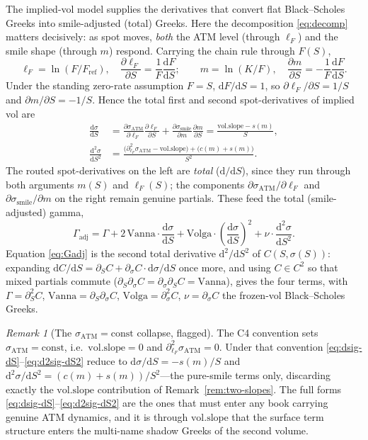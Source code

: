 \documentclass[11pt]{book}
\theoremstyle{plain}
\theoremstyle{definition}
\theoremstyle{remark}
\newtheorem{remark}[theorem]{Remark}
\newcommand{\mln}{m}                             %
\newcommand{\lF}{\ell_F}                         %
\newcommand{\Fref}{F_{\mathrm{ref}}}             %
\newcommand{\ssm}{\sigma_{\mathrm{smile}}}       %
\newcommand{\satm}{\sigma_{\mathrm{ATM}}}        %
\newcommand{\volslope}{\mathrm{vol.slope}}       %
\newcommand{\vega}{\nu}                          %
\newcommand{\Vanna}{\mathrm{Vanna}}
\newcommand{\Volga}{\mathrm{Volga}}
\newcommand{\Gadj}{\Gamma_{\mathrm{adj}}}        %
\newcommand{\dd}{\mathrm{d}}                                  %
\newcommand{\pd}[2]{\frac{\partial #1}{\partial #2}}          %
\newcommand{\td}[2]{\frac{\dd #1}{\dd #2}}                    %
\begin{document}
The implied-vol model supplies the derivatives that convert flat Black--Scholes
Greeks into smile-adjusted (total) Greeks. Here the decomposition
\eqref{eq:decomp} matters decisively: as spot moves, \emph{both} the ATM level
(through $\lF$) and the smile shape (through $\mln$) respond. Carrying the chain
rule through $F(S)$,
\[
\lF = \ln(F/\Fref), \quad \pd{\lF}{S} = \frac{1}{F}\td{F}{S};
\qquad
\mln = \ln(K/F), \quad \pd{\mln}{S} = -\frac{1}{F}\td{F}{S}.
\]
Under the standing zero-rate assumption $F = S$, $\dd F/\dd S = 1$,
so $\partial\lF/\partial S = 1/S$ and $\partial\mln/\partial S = -1/S$.
Hence the total first and second spot-derivatives of implied vol are
\begin{align}
\td{\sigma}{S}
&= \pd{\satm}{\lF}\pd{\lF}{S} + \pd{\ssm}{\mln}\pd{\mln}{S}
= \frac{\volslope - s(\mln)}{S}, \label{eq:dsig-dS}\\[4pt]
\frac{\dd^2\sigma}{\dd S^2}
&= \frac{\bigl(\partial_{\lF}^2\satm - \volslope\bigr) + \bigl(c(\mln) + s(\mln)\bigr)}{S^2}.
\label{eq:d2sig-dS2}
\end{align}
The routed spot-derivatives on the left are \emph{total} ($\dd/\dd S$), since
they run through both arguments $\mln(S)$ and $\lF(S)$; the components
$\partial\satm/\partial\lF$ and $\partial\ssm/\partial\mln$ on the right remain
genuine partials. These feed the total (smile-adjusted) gamma,
\begin{equation}\label{eq:Gadj}
\Gadj = \Gamma + 2\,\Vanna\cdot\td{\sigma}{S}
+ \Volga\cdot\!\left(\td{\sigma}{S}\right)^{\!2}
+ \vega\cdot\frac{\dd^2\sigma}{\dd S^2}.
\end{equation}
Equation \eqref{eq:Gadj} is the second total derivative $\dd^2/\dd S^2$ of
$C(S,\sigma(S))$: expanding
$\dd C/\dd S = \partial_S C + \partial_\sigma C\cdot\dd\sigma/\dd S$ once more,
and using $C\in C^2$ so that mixed partials commute
($\partial_S\partial_\sigma C = \partial_\sigma\partial_S C = \Vanna$), gives the
four terms, with $\Gamma=\partial_S^2 C$, $\Vanna=\partial_S\partial_\sigma C$,
$\Volga=\partial_\sigma^2 C$, $\vega=\partial_\sigma C$ the frozen-vol
Black--Scholes Greeks.

\begin{remark}[The $\satm=\text{const}$ collapse, flagged]\label{rem:const-flag}
The C4 convention sets $\satm = \mathrm{const}$, i.e.\
$\volslope = 0$ and $\partial_{\lF}^2\satm = 0$. Under that convention
\eqref{eq:dsig-dS}--\eqref{eq:d2sig-dS2} reduce to
$\dd\sigma/\dd S = -s(\mln)/S$ and
$\dd^2\sigma/\dd S^2 = (c(\mln)+s(\mln))/S^2$---the pure-smile terms
only, discarding exactly the $\volslope$ contribution of
Remark~\ref{rem:two-slopes}. The full
forms \eqref{eq:dsig-dS}--\eqref{eq:d2sig-dS2} are the ones that must enter any
book carrying genuine ATM dynamics, and it is through $\volslope$ that the
surface term structure enters the multi-name shadow Greeks of the second
volume.
\end{remark}
\end{document}
